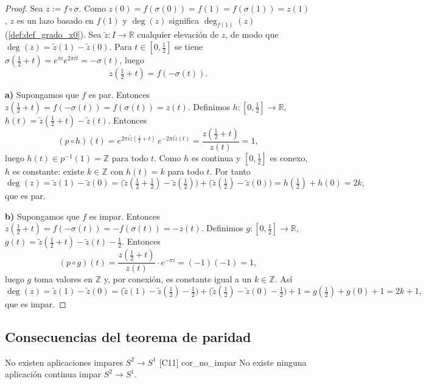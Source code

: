 \begin{proof}
Sea $z := f \circ \sigma$. Como $z(0) = f(\sigma(0)) = f(1) = f(\sigma(1)) = z(1)$, $z$ es un lazo basado en $f(1)$ y $\deg(z)$ significa $\deg_{f(1)}(z)$ (\cref{def:def_grado_x0}). Sea $\tilde{z} \colon I \to \mathbb{R}$ cualquier elevación de $z$, de modo que $\deg(z) = \tilde{z}(1) - \tilde{z}(0)$. Para $t \in [0,\frac12]$ se tiene $\sigma(\frac12 + t) = e^{\pi i} e^{2\pi i t} = -\sigma(t)$, luego
\[ z\left(\tfrac12 + t\right) = f\left(-\sigma(t)\right). \]

\textbf{a)} Supongamos que $f$ es par. Entonces $z(\frac12 + t) = f(-\sigma(t)) = f(\sigma(t)) = z(t)$. Definimos $h \colon [0,\frac12] \to \mathbb{R}$, $h(t) = \tilde{z}(\frac12 + t) - \tilde{z}(t)$. Entonces
\[ (p \circ h)(t) = e^{2\pi i \tilde{z}(\frac12 + t)} \, e^{-2\pi i \tilde{z}(t)} = \frac{z(\frac12 + t)}{z(t)} = 1, \]
luego $h(t) \in p^{-1}(1) = \mathbb{Z}$ para todo $t$. Como $h$ es continua y $[0,\frac12]$ es conexo, $h$ es constante: existe $k \in \mathbb{Z}$ con $h(t) = k$ para todo $t$. Por tanto
\[ \deg(z) = \tilde{z}(1) - \tilde{z}(0) = \big(\tilde{z}(\tfrac12 + \tfrac12) - \tilde{z}(\tfrac12)\big) + \big(\tilde{z}(\tfrac12) - \tilde{z}(0)\big) = h(\tfrac12) + h(0) = 2k, \]
que es par.

\textbf{b)} Supongamos que $f$ es impar. Entonces $z(\frac12 + t) = f(-\sigma(t)) = -f(\sigma(t)) = -z(t)$. Definimos $g \colon [0,\frac12] \to \mathbb{R}$, $g(t) = \tilde{z}(\frac12 + t) - \tilde{z}(t) - \frac12$. Entonces
\[ (p \circ g)(t) = \frac{z(\frac12 + t)}{z(t)} \cdot e^{-\pi i} = (-1)(-1) = 1, \]
luego $g$ toma valores en $\mathbb{Z}$ y, por conexión, es constante igual a un $k \in \mathbb{Z}$. Así
\[ \deg(z) = \tilde{z}(1) - \tilde{z}(0) = \big(\tilde{z}(1) - \tilde{z}(\tfrac12) - \tfrac12\big) + \big(\tilde{z}(\tfrac12) - \tilde{z}(0) - \tfrac12\big) + 1 = g(\tfrac12) + g(0) + 1 = 2k + 1, \]
que es impar.
\end{proof}

\subsection{Consecuencias del teorema de paridad}

\begin{proposicion}{No existen aplicaciones impares $S^2 \to S^1$ [C11] \marcaC}{cor_no_impar}
No existe ninguna aplicación continua impar $S^2 \to S^1$.
\end{proposicion}

